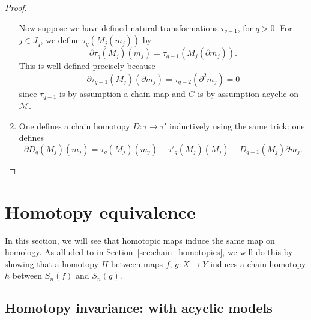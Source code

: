 \documentclass[main.tex]{subfiles}
\begin{document}
\begin{proof}
\begin{enumerate}
      Now suppose we have defined natural transformations $\tau_{q-1}$, for $q > 0$. For $j \in J_{q}$, we define $\tau_{q}(M_{j}(m_{j}))$ by
      \begin{equation*}
        \partial \tau_{q}(M_{j})(m_{j}) = \tau_{q-1}(M_{j}(\partial m_{j})).
      \end{equation*}
      This is well-defined precisely because
      \begin{equation*}
        \partial \tau_{q-1}(M_{j})(\partial m_{j}) = \tau_{q-2}(\partial^{2} m_{j}) = 0
      \end{equation*}
      since $\tau_{q-1}$ is by assumption a chain map and $G$ is by assumption acyclic on $\mathcal{M}$.

    \item One defines a chain homotopy \(D\colon \tau \to \tau'\) inductively using the same trick: one defines
      \begin{equation*}
        \partial D_{q}(M_{j})(m_{j}) = \tau_{q}(M_{j})(m_{j}) - \tau'_{q}(M_{j})(M_{j}) - D_{q-1}(M_{j}) \partial m_{j}.
      \end{equation*}
  \end{enumerate}
\end{proof}

\section{Homotopy equivalence}
\label{sec:homotopy_equivalence}

In this section, we will see that homotopic maps induce the same map on homology. As alluded to in \hyperref[sec:chain_homotopies]{Section~\ref*{sec:chain_homotopies}}, we will do this by showing that a homotopy $H$ between maps $f$, $g\colon X \to Y$ induces a chain homotopy $h$ between $S_{n}(f)$ and $S_{n}(g)$.

\subsection{Homotopy invariance: with acyclic models}
\label{ssc:homotopy_invariance_with_acyclic_models}
\end{document}
